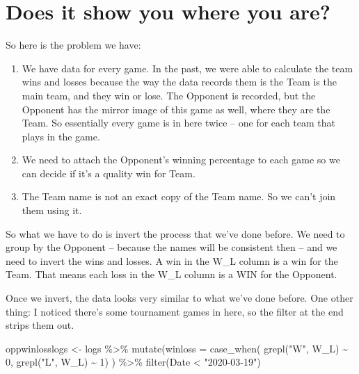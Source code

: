 \documentclass[
]{book}
\newenvironment{Shaded}{\begin{snugshade}}{\end{snugshade}}
\newcommand{\AttributeTok}[1]{\textcolor[rgb]{0.77,0.63,0.00}{#1}}
\newcommand{\DecValTok}[1]{\textcolor[rgb]{0.00,0.00,0.81}{#1}}
\newcommand{\FunctionTok}[1]{\textcolor[rgb]{0.00,0.00,0.00}{#1}}
\newcommand{\NormalTok}[1]{#1}
\newcommand{\OtherTok}[1]{\textcolor[rgb]{0.56,0.35,0.01}{#1}}
\newcommand{\SpecialCharTok}[1]{\textcolor[rgb]{0.00,0.00,0.00}{#1}}
\newcommand{\StringTok}[1]{\textcolor[rgb]{0.31,0.60,0.02}{#1}}
\providecommand{\tightlist}{%
  \setlength{\itemsep}{0pt}\setlength{\parskip}{0pt}}
\begin{document}
\hypertarget{does-it-show-you-where-you-are}{%
\section{Does it show you where you are?}\label{does-it-show-you-where-you-are}}

So here is the problem we have:

\begin{enumerate}
\def\labelenumi{\arabic{enumi}.}
\tightlist
\item
  We have data for every game. In the past, we were able to calculate the team wins and losses because the way the data records them is the Team is the main team, and they win or lose. The Opponent is recorded, but the Opponent has the mirror image of this game as well, where they are the Team. So essentially every game is in here twice -- one for each team that plays in the game.
\item
  We need to attach the Opponent's winning percentage to each game so we can decide if it's a quality win for Team.
\item
  The Team name is not an exact copy of the Team name. So we can't join them using it.
\end{enumerate}

So what we have to do is invert the process that we've done before. We need to group by the Opponent -- because the names will be consistent then -- and we need to invert the wins and losses. A win in the W\_L column is a win for the Team. That means each loss in the W\_L column is a WIN for the Opponent.

Once we invert, the data looks very similar to what we've done before. One other thing: I noticed there's some tournament games in here, so the filter at the end strips them out.

\begin{Shaded}
\begin{Highlighting}[]
\NormalTok{oppwinlosslogs }\OtherTok{\textless{}{-}}\NormalTok{ logs }\SpecialCharTok{\%\textgreater{}\%} \FunctionTok{mutate}\NormalTok{(}\AttributeTok{winloss =} \FunctionTok{case\_when}\NormalTok{(}
  \FunctionTok{grepl}\NormalTok{(}\StringTok{"W"}\NormalTok{, W\_L) }\SpecialCharTok{\textasciitilde{}} \DecValTok{0}\NormalTok{, }
  \FunctionTok{grepl}\NormalTok{(}\StringTok{"L"}\NormalTok{, W\_L) }\SpecialCharTok{\textasciitilde{}} \DecValTok{1}\NormalTok{)}
\NormalTok{) }\SpecialCharTok{\%\textgreater{}\%} \FunctionTok{filter}\NormalTok{(Date }\SpecialCharTok{\textless{}} \StringTok{"2020{-}03{-}19"}\NormalTok{)}
\end{Highlighting}
\end{Shaded}
\end{document}
